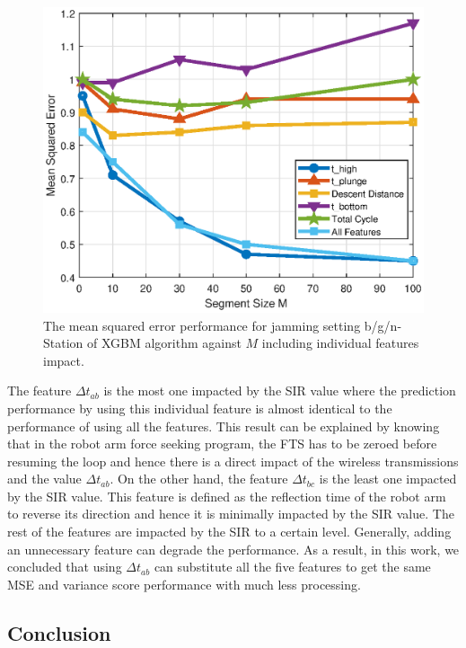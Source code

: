 \begin{figure}[!ht]
	\centering
	\includegraphics[width=0.9\columnwidth]{./chapter-ftml/plots/004_MSE_F_3.eps}
	\caption{The mean squared error performance for jamming setting b/g/n-Station of XGBM algorithm against $M$ including individual features impact.}
	\label{ftml-jrnl:fig:004_MSE_F_3}      
\end{figure}

The feature $\Delta{t}_{ab}$ is the most one impacted by the SIR value where the prediction performance by using this individual feature is almost identical to the performance of using all the features. This result can be explained by knowing that in the robot arm force seeking program, the FTS has to be zeroed before resuming the loop and hence there is a direct impact of the wireless transmissions and the value $\Delta{t}_{ab}$. On the other hand, the feature $\Delta{t}_{bc}$ is the least one impacted by the SIR value. This feature is defined as the reflection time of the robot arm to reverse its direction and hence it is minimally impacted by the SIR value. The rest of the features are impacted by the SIR to a certain level. Generally, adding an unnecessary feature can degrade the performance. As a result, in this work, we concluded that using $\Delta{t}_{ab}$ can substitute all the five features to get the same MSE and variance score performance with much less processing.

\subsection{Conclusion}\label{ftml-jrnl:sec:conclusion}

